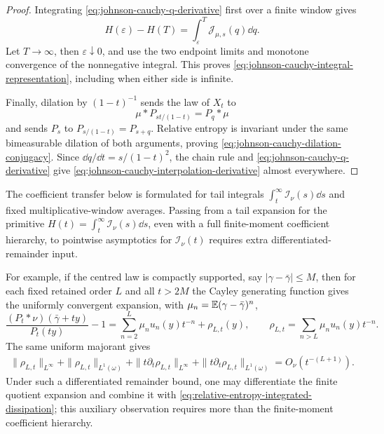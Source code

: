 \begin{proof}
Integrating \eqref{eq:johnson-cauchy-q-derivative} first over a finite
window gives
\[
H(\varepsilon)-H(T)
=\int_\varepsilon^T\mathcal J_{\mu,s}(q)\dd q.
\]
Let \(T\to\infty\), then \(\varepsilon\downarrow0\), and use the two endpoint
limits and monotone convergence of the nonnegative integral.  This proves
\eqref{eq:johnson-cauchy-integral-representation}, including when either
side is infinite.

Finally, dilation by \((1-t)^{-1}\) sends the law of \(X_t\) to
\[
\mu*P_{st/(1-t)}=P_q*\mu
\]
and sends \(P_s\) to
\(P_{s/(1-t)}=P_{s+q}\).  Relative entropy is invariant under the same
bimeasurable dilation of both arguments, proving
\eqref{eq:johnson-cauchy-dilation-conjugacy}.  Since
\(\dd q/\dd t=s/(1-t)^2\), the chain rule and
\eqref{eq:johnson-cauchy-q-derivative} give
\eqref{eq:johnson-cauchy-interpolation-derivative} almost everywhere.
\end{proof}

\begin{remark}
\label{rem:no-pointwise-dissipation-from-finite-moments}
The coefficient transfer below is formulated for tail integrals
\(\int_t^\infty\mathcal I_\nu(s)\dd s\) and fixed multiplicative-window
averages.  Passing from a tail expansion for the primitive
\(H(t)=\int_t^\infty\mathcal I_\nu(s)\dd s\), even with a full finite-moment
coefficient hierarchy, to pointwise asymptotics for \(\mathcal I_\nu(t)\)
requires extra differentiated-remainder input.

For example, if the centred law is compactly supported, say
\(|\gamma-\bar{\gamma}|\le M\), then for each fixed retained order \(L\) and
all \(t>2M\) the Cayley generating function gives the uniformly convergent
expansion, with \(\mu_n=\mathbb{E}(\gamma-\bar{\gamma})^n\),
\[
\frac{(P_t*\nu)(\bar{\gamma}+ty)}{P_t(ty)}-1
=\sum_{n=2}^{L}\mu_nu_n(y)t^{-n}+\rho_{L,t}(y),
\qquad
\rho_{L,t}=\sum_{n>L}\mu_nu_n(y)t^{-n}.
\]
The same uniform majorant gives
\[
\begin{aligned}
\|\rho_{L,t}\|_{L^\infty}
+\|\rho_{L,t}\|_{L^1(\omega)}
+\|t\partial_t\rho_{L,t}\|_{L^\infty}
+\|t\partial_t\rho_{L,t}\|_{L^1(\omega)}
=O_\nu(t^{-(L+1)}).
\end{aligned}
\]
Under such a differentiated remainder bound, one may
differentiate the finite quotient expansion and combine it with
\eqref{eq:relative-entropy-integrated-dissipation}; this auxiliary
observation requires more than the finite-moment coefficient hierarchy.
\end{remark}

